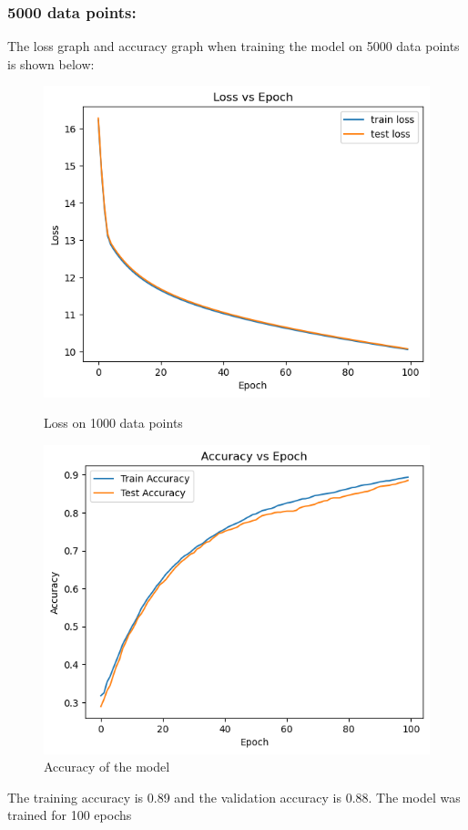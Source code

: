\documentclass{article}
\begin{document}
\subsubsection*{5000 data points:}
The loss graph and accuracy graph when training the model on 5000 data points is shown below:
\begin{figure}[h!]
    \centering
    \begin{minipage}{0.45\textwidth}
        \centering
        \includegraphics[width=1\textwidth]{graphs/loss_5000.png} %
        \caption{Loss on 1000 data points}
    \end{minipage}\hfill
    \begin{minipage}{0.45\textwidth}
        \centering
        \includegraphics[width=1\textwidth]{graphs/accuracy_5000.png} %
        \caption{Accuracy of the model}
    \end{minipage}
\end{figure}
\newline The training accuracy is 0.89 and the validation accuracy is 0.88. The model was trained for 100 epochs\newline
\end{document}
